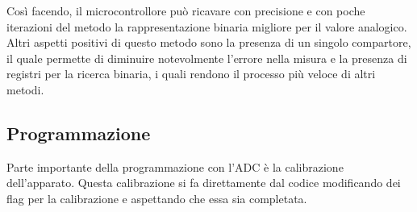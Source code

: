 Così facendo, il microcontrollore può ricavare con precisione e con poche iterazioni del metodo la rappresentazione binaria migliore per il valore analogico.\\

Altri aspetti positivi di questo metodo sono la presenza di un singolo compartore, il quale permette di diminuire notevolmente l'errore nella misura e la presenza di registri per la ricerca binaria, i quali rendono il processo più veloce di altri metodi.\\

\subsection{Programmazione}
Parte importante della programmazione con l'ADC è la calibrazione dell'apparato. Questa calibrazione si fa direttamente dal codice modificando dei flag per la calibrazione e aspettando che essa sia completata.\\

